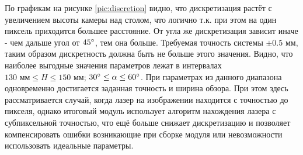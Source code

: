         По графикам на рисунке \ref{pic:discretion} видно, что дискретизация растёт с увеличением высоты камеры над столом, что логично т.к. при этом на один пиксель приходится большее расстояние. От угла же дискретизация зависит иначе - чем дальше угол от $ 45^{\circ} $, тем  она больше. Требуемая точность системы $ \pm 0.5\text{ мм} $, таким образом дискретность должна быть не больше этого значения. Видно, что наиболее выгодные значения параметров лежат в интервалах $ 130 \text{ мм} \le H \le 150 \text{ мм} $; $ 30^{\circ} \le \alpha \le 60^{\circ} $. 
        При параметрах из данного диапазона одновременно достигается заданная точность и ширина обзора.
        При этом здесь рассматривается случай, когда лазер на изображении находится с точностью до пикселя, однако итоговый модуль использует алгоритм нахождения лазера с субпиксельной точностью, что ещё больше снижает дискретизацию и позволяет компенсировать ошибки возникающие при сборке модуля или невозможности использовать идеальные параметры.

